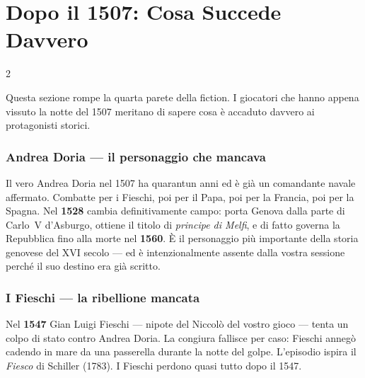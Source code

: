 \section{Dopo il 1507: Cosa Succede Davvero}
\label{sec:dopo}

\begin{multicols}{2}

Questa sezione rompe la quarta parete della fiction. I giocatori che
hanno appena vissuto la notte del 1507 meritano di sapere cosa è
accaduto davvero ai protagonisti storici.

\subsubsection{Andrea Doria — il personaggio che mancava}


Il vero Andrea Doria nel 1507 ha quarantun anni ed è già un comandante
navale affermato. Combatte per i Fieschi, poi per il Papa, poi per
la Francia, poi per la Spagna. Nel \textbf{1528} cambia definitivamente
campo: porta Genova dalla parte di Carlo~V d'Asburgo, ottiene il titolo
di \textit{principe di Melfi}, e di fatto governa la Repubblica fino
alla morte nel \textbf{1560}. È il personaggio più importante della
storia genovese del XVI secolo — ed è intenzionalmente assente dalla
vostra sessione perché il suo destino era già scritto.

\columnbreak

\subsubsection{I Fieschi — la ribellione mancata}


Nel \textbf{1547} Gian Luigi Fieschi — nipote del Niccolò del vostro
gioco — tenta un colpo di stato contro Andrea Doria. La congiura
fallisce per caso: Fieschi annegò cadendo in mare da una passerella
durante la notte del golpe. L'episodio ispira il \textit{Fiesco} di
Schiller (1783). I Fieschi perdono quasi tutto dopo il 1547.


\end{multicols}
